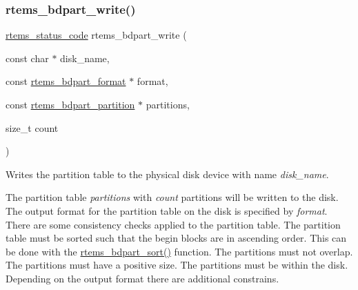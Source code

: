 \subsubsection{\texorpdfstring{rtems\_bdpart\_write()}{rtems\_bdpart\_write()}}
{\footnotesize\ttfamily \mbox{\hyperlink{group__ClassicStatus_ga545d41846817eaba6143d52ee4d9e9fe}{rtems\+\_\+status\+\_\+code}} rtems\+\_\+bdpart\+\_\+write (\begin{DoxyParamCaption}\item[{const char $\ast$}]{disk\+\_\+name,  }\item[{const \mbox{\hyperlink{unionrtems__bdpart__format}{rtems\+\_\+bdpart\+\_\+format}} $\ast$}]{format,  }\item[{const \mbox{\hyperlink{structrtems__bdpart__partition}{rtems\+\_\+bdpart\+\_\+partition}} $\ast$}]{partitions,  }\item[{size\+\_\+t}]{count }\end{DoxyParamCaption})}



Writes the partition table to the physical disk device with name {\itshape disk\+\_\+name}. 

The partition table {\itshape partitions} with {\itshape count} partitions will be written to the disk. The output format for the partition table on the disk is specified by {\itshape format}. There are some consistency checks applied to the partition table. The partition table must be sorted such that the begin blocks are in ascending order. This can be done with the \mbox{\hyperlink{group__rtems__bdpart_gaec68d844510e8516ae962f29d1cdd384}{rtems\+\_\+bdpart\+\_\+sort()}} function. The partitions must not overlap. The partitions must have a positive size. The partitions must be within the disk. Depending on the output format there are additional constrains. 